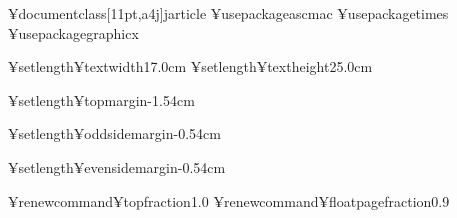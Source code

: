 

¥documentclass[11pt,a4j]{jarticle}
¥usepackage{ascmac}
¥usepackage{times}
¥usepackage{graphicx}

¥setlength¥textwidth{17.0cm}
¥setlength¥textheight{25.0cm}

¥setlength¥topmargin{-1.54cm}

¥setlength¥oddsidemargin{-0.54cm}

¥setlength¥evensidemargin{-0.54cm}


¥renewcommand{¥topfraction}{1.0}
¥renewcommand{¥floatpagefraction}{0.9}

